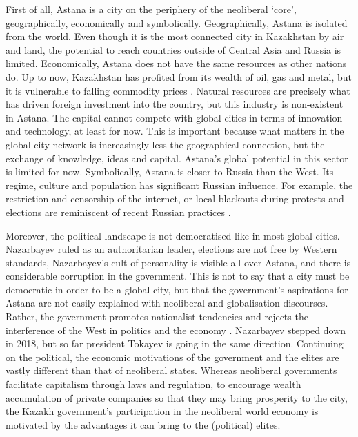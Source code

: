 \documentclass{article}
\begin{document}
First of all, Astana is a city on the periphery of the neoliberal `core', geographically, economically and symbolically.  Geographically, Astana is isolated from the world. Even though it is the most connected city in Kazakhstan by air and land, the potential to reach countries outside of Central Asia and Russia is limited.
Economically, Astana does not have the same resources as other nations do. Up to now, Kazakhstan has profited from its wealth of oil, gas and metal, but it is vulnerable to falling commodity prices \parencite{batsaikhan2017central}. Natural resources are precisely what has driven foreign investment into the country, but this industry is non-existent in Astana. The capital cannot compete with global cities in terms of innovation and technology, at least for now. This is important because what matters in the global city network is increasingly less the geographical connection, but the exchange of knowledge, ideas and capital. Astana's global potential in this sector is limited for now.
Symbolically, Astana is closer to Russia than the West. Its regime, culture and population has significant Russian influence. For example, the restriction and censorship of the internet, or local blackouts during protests and elections are reminiscent of recent Russian practices \parencite{freedomhouse2021}.

Moreover, the political landscape is not democratised like in most global cities. Nazarbayev ruled as an authoritarian leader, elections are not free by Western standards, Nazarbayev's cult of personality is visible all over Astana, and there is considerable corruption in the government. This is not to say that a city must be democratic in order to be a global city, but that the government's aspirations for Astana are not easily explained with neoliberal and globalisation discourses. Rather, the government promotes nationalist tendencies and rejects the interference of the West in politics and the economy \parencite{koch2013not}. Nazarbayev stepped down in 2018, but so far president Tokayev is going in the same direction.
Continuing on the political, the economic motivations of the government and the elites are vastly different than that of neoliberal states. Whereas neoliberal governments facilitate capitalism through laws and regulation, to encourage wealth accumulation of private companies so that they may bring prosperity to the city, the Kazakh government's participation in the neoliberal world economy is motivated by the advantages it can bring to the (political) elites.
\end{document}
